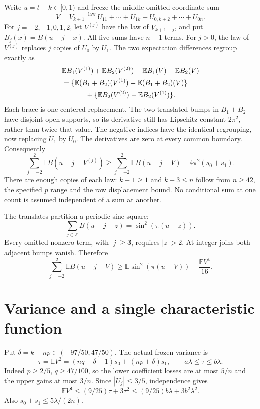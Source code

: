 \documentclass[11pt]{article}
\newcommand{\E}{\mathbb E}\newcommand{\Pp}{\mathbb P}
\begin{document}
Write $u=t-k\in[0,1)$ and freeze the middle omitted-coordinate sum
\[
V=V_{k+1}\ \stackrel{\mathrm{law}}=
U_{11}+\cdots+U_{1k}
+U_{0,k+2}+\cdots+U_{0n}.
\]
For $j=-2,-1,0,1,2$, let $V^{(j)}$ have the law of $V_{k+1+j}$,
and put $B_j(x)=B(u-j-x)$. All five sums have $n-1$ terms.
For $j>0$, the law of $V^{(j)}$ replaces $j$ copies of $U_0$ by $U_1$.
The two expectation differences regroup exactly as
\begin{align*}
&\E B_1(V^{(1)})+\E B_2(V^{(2)})
 -\E B_1(V)-\E B_2(V)\\
&=\{\E(B_1+B_2)(V^{(1)})-\E(B_1+B_2)(V)\}\\
&\hspace{12mm}+\{\E B_2(V^{(2)})-\E B_2(V^{(1)})\}.
\end{align*}
Each brace is one centered replacement. The two translated bumps in
$B_1+B_2$ have disjoint open supports, so its derivative still has
Lipschitz constant $2\pi^2$, rather than twice that value.
The negative indices have the identical regrouping, now replacing $U_1$
by $U_0$. The derivatives are zero at every common boundary.
Consequently
\begin{equation}\label{eq:swap}
\sum_{j=-2}^2\E B(u-j-V^{(j)})
\ge\sum_{j=-2}^2\E B(u-j-V)-4\pi^2(s_0+s_1).
\end{equation}
There are enough copies of each law: $k-1\ge1$ and $k+3\le n$ follow
from $n\ge42$, the specified $p$ range and the raw displacement bound.
No conditional sum at one count is assumed independent of a sum at another.

The translates partition a periodic sine square:
\[
\sum_{j\in\mathbb Z}B(u-j-z)=\sin^2(\pi(u-z)).
\]
Every omitted nonzero term, with $|j|\ge3$, requires $|z|>2$.
At integer joins both adjacent bumps vanish. Therefore
\begin{equation}\label{eq:tail}
\sum_{j=-2}^2\E B(u-j-V)
\ge \E\sin^2(\pi(u-V))-\frac{\E V^4}{16}.
\end{equation}

\section{Variance and a single characteristic function}
Put $\delta=k-np\in(-97/50,47/50)$. The actual frozen variance is
\[
\tau=\E V^2=(nq-\delta-1)s_0+(np+\delta)s_1,
\qquad a\lambda\le\tau\le b\lambda.
\]
Indeed $p\ge2/5$, $q\ge47/100$, so the lower coefficient losses are
at most $5/n$ and the upper gains at most $3/n$. Since $|U_j|\le3/5$,
independence gives
\[
\E V^4\le(9/25)\tau+3\tau^2
\le(9/25)b\lambda+3b^2\lambda^2.
\]
Also $s_0+s_1\le5\lambda/(2n)$.
\end{document}
